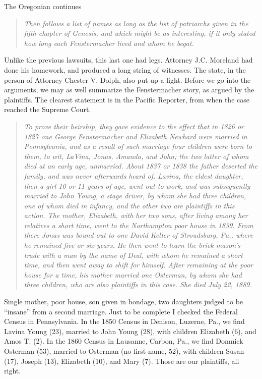 \documentclass[
  12pt,
]{book}
\begin{document}
The Oregonian continues

\begin{quote}
\emph{Then follows a list of names as long as the list of patriarchs given in the fifth chapter of Genesis, and which might be as interesting, if it only stated how long each Fenstermacher lived and whom he begat.}
\end{quote}

Unlike the previous lawsuits, this last one had legs. Attorney J.C. Moreland had done his homework, and produced a long string of witnesses. The state, in the person of Attorney Chester V. Dolph, also put up a fight. Before we go into the arguments, we may as well summarize the Fenstermacher story, as argued by the plaintiffs. The clearest statement is in the Pacific Reporter, from when the case reached the Supreme Court.

\begin{quote}
\emph{To prove their heirship, they gave evidence to the effect that in 1826 or 1827 one George Fenstermacher and Elizabeth Newhard were married in Pennsylvania, and as a result of such marriage four children were born to them, to wit, LaVina, Jonas, Amanda, and John; the two latter of whom died at an early age, unmarried. About 1837 or 1838 the father deserted the family, and was never afterwards heard of. Lavina, the eldest daughter, then a girl 10 or 11 years of age, went out to work, and was subsequently married to John Young, a stage driver, by whom she had three children, one of whom died in infancy, and the other two are plaintiffs in this action. The mother, Elizabeth, with her two sons, after living among her relatives a short time, went to the Northampton poor house in 1839. From there Jonas was bound out to one David Keller of Stroudsburg, Pa., where he remained five or six years. He then went to learn the brick mason's trade with a man by the name of Deal, with whom he remained a short time, and then went away to shift for himself. After remaining at the poor house for a time, his mother married one Osterman, by whom she had three children, who are also plaintiffs in this case. She died July 22, 1889. }
\end{quote}

Single mother, poor house, son given in bondage, two daughters judged to be ``insane'' from a second marriage. Just to be complete I checked the Federal Census in Pennsylvania. In the 1850 Census in Denison, Luzerne, Pa., we find Lavina Young (23), married to John Young (28), with children Elizabeth (6), and Amos T. (2). In the 1860 Census in Lausanne, Carbon, Pa., we find Domnick Osterman (53), married to Osterman (no first name, 52), with children Susan (17), Joseph (13), Elizabeth (10), and Mary (7). Those are our plaintiffs, all right.
\end{document}
